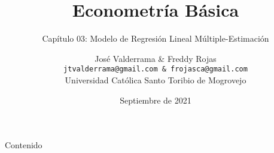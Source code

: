 \documentclass[10pt]{beamer}
\title[Capítulo 03]{Econometría Básica}
\subtitle{Capítulo 03: Modelo de Regresión Lineal Múltiple-Estimación}
\author[José Valderrama \& Freddy Rojas]{José Valderrama \& Freddy Rojas \\
	\texttt{jtvalderrama@gmail.com \& frojasca@gmail.com} \faIcon{envelope}\\
	Universidad Católica Santo Toribio de Mogrovejo}
\date[Septiembre de 2021]{Septiembre de 2021}
\begin{document}
	\rmfamily
		\begin{frame}
			\maketitle
		\end{frame}
	\begin{frame}{Contenido}
		\tableofcontents
	\end{frame}

%	
%	
%	
%	
%	
%	
%	
%	

	
	
	
	
	
	
	
	
\begin{frame}
	\maketitle
\end{frame}
\end{document}
